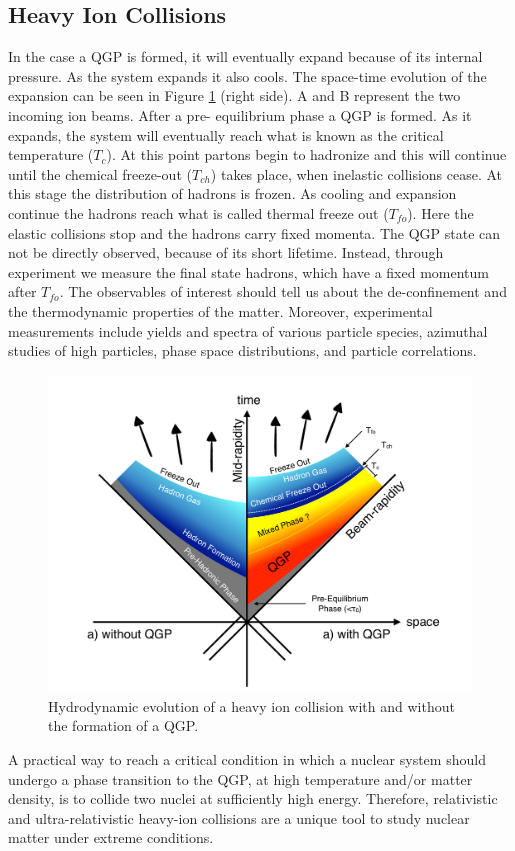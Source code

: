 \subsection{Heavy Ion Collisions}
In the case a QGP is formed, it will eventually expand because of its internal pressure. As the system expands it also cools. The space-time evolution of the expansion can be seen in Figure \ref{fig:freezeout} (right side). A and B represent the two incoming ion beams. After a pre- equilibrium phase a QGP is formed. As it expands, the system will eventually reach what is known as the critical temperature ($T_{c}$). At this point partons begin to hadronize and this will continue until the chemical freeze-out ($T_{ch}$) takes place, when inelastic collisions cease. At this stage the distribution of hadrons is frozen. As cooling and expansion continue the hadrons reach what is called thermal freeze out ($T_{fo}$). Here the elastic collisions stop and the hadrons carry fixed momenta. The QGP state can not be directly observed, because of its short lifetime. Instead, through experiment we measure the final state hadrons, which have a fixed momentum after $T_{fo}$. The observables of interest should tell us about the de-confinement and the thermodynamic properties of the matter. Moreover, experimental measurements include yields and \pt spectra of various particle species, azimuthal studies of high \pt particles, phase space distributions, and particle correlations.

\begin{figure}[htbp]
\begin{center}
\includegraphics[width=12.cm]{./Version1/FigChapter1/FreezeOut}
\caption{Hydrodynamic evolution of a heavy ion collision with and without the formation of a QGP. }
\label{fig:freezeout}
\end{center}
\end{figure}

A practical way to reach a critical condition in which a nuclear system should undergo a phase transition to the QGP, at high temperature and/or matter density, is to collide two nuclei at sufficiently high energy. Therefore, relativistic and ultra-relativistic heavy-ion collisions are a unique tool to study nuclear matter under extreme conditions.


\newpage